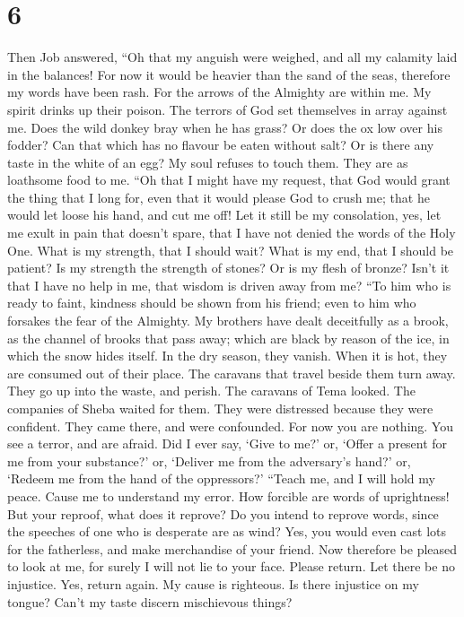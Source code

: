 \hypertarget{section-5}{%
\section{6}\label{section-5}}

 Then Job answered,  ``Oh that my anguish
were weighed, and all my calamity laid in the balances! 
For now it would be heavier than the sand of the seas, therefore my
words have been rash.  For the arrows of the Almighty are
within me. My spirit drinks up their poison. The terrors of God set
themselves in array against me.  Does the wild donkey bray
when he has grass? Or does the ox low over his fodder? 
Can that which has no flavour be eaten without salt? Or is there any
taste in the white of an egg?  My soul refuses to touch
them. They are as loathsome food to me.  ``Oh that I might
have my request, that God would grant the thing that I long for,
 even that it would please God to crush me; that he would
let loose his hand, and cut me off!  Let it still be my
consolation, yes, let me exult in pain that doesn't spare, that I have
not denied the words of the Holy One.  What is my
strength, that I should wait? What is my end, that I should be patient?
 Is my strength the strength of stones? Or is my flesh of
bronze?  Isn't it that I have no help in me, that wisdom
is driven away from me?  ``To him who is ready to faint,
kindness should be shown from his friend; even to him who forsakes the
fear of the Almighty.  My brothers have dealt deceitfully
as a brook, as the channel of brooks that pass away; 
which are black by reason of the ice, in which the snow hides itself.
 In the dry season, they vanish. When it is hot, they are
consumed out of their place.  The caravans that travel
beside them turn away. They go up into the waste, and perish.
 The caravans of Tema looked. The companies of Sheba
waited for them.  They were distressed because they were
confident. They came there, and were confounded.  For now
you are nothing. You see a terror, and are afraid.  Did I
ever say, `Give to me?' or, `Offer a present for me from your
substance?'  or, `Deliver me from the adversary's hand?'
or, `Redeem me from the hand of the oppressors?'  ``Teach
me, and I will hold my peace. Cause me to understand my error.
 How forcible are words of uprightness! But your reproof,
what does it reprove?  Do you intend to reprove words,
since the speeches of one who is desperate are as wind? 
Yes, you would even cast lots for the fatherless, and make merchandise
of your friend.  Now therefore be pleased to look at me,
for surely I will not lie to your face.  Please return.
Let there be no injustice. Yes, return again. My cause is righteous.
 Is there injustice on my tongue? Can't my taste discern
mischievous things?

